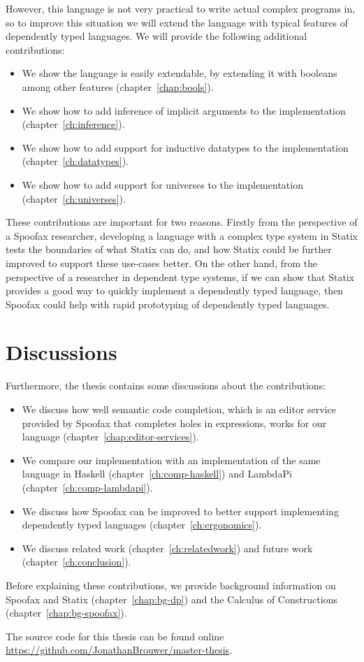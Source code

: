 However, this language is not very practical to write actual complex programs in, so to improve this situation we will extend the language with typical features of dependently typed languages. We will provide the following additional contributions:
\begin{itemize}
	\item We show the language is easily extendable, by extending it with booleans among other features (chapter~\ref{chap:bools}).
	\item We show how to add inference of implicit arguments to the implementation (chapter~\ref{ch:inference}).
	\item We show how to add support for inductive datatypes to the implementation (chapter~\ref{ch:datatypes}).
	\item We show how to add support for universes to the implementation (chapter~\ref{ch:universes}).
\end{itemize}

These contributions are important for two reasons. Firstly from the perspective of a Spoofax researcher, developing a language with a complex type system in Statix tests the boundaries of what Statix can do, and how Statix could be further improved to support these use-cases better. On the other hand, from the perspective of a researcher in dependent type systems, if we can show that Statix provides a good way to quickly implement a dependently typed language, then Spoofax could help with rapid prototyping of dependently typed languages.

\section*{Discussions}

Furthermore, the thesis contains some discussions about the contributions:
\begin{itemize}
	\item We discuss how well semantic code completion, which is an editor service provided by Spoofax that completes holes in expressions, works for our language (chapter~\ref{chap:editor-services}).
	\item We compare our implementation with an implementation of the same language in Haskell (chapter~\ref{ch:comp-haskell}) and LambdaPi (chapter~\ref{ch:comp-lambdapi}).
	\item We discuss how Spoofax can be improved to better support implementing dependently typed languages (chapter~\ref{ch:ergonomics}).
	\item We discuss related work (chapter~\ref{ch:relatedwork}) and future work (chapter~\ref{ch:conclusion}).
\end{itemize}

\noindent Before explaining these contributions, we provide background information on Spoofax and Statix (chapter~\ref{chap:bg-dp}) and the Calculus of Constructions (chapter~\ref{chap:bg-spoofax}).

The source code for this thesis can be found online \\ \url{https://github.com/JonathanBrouwer/master-thesis}.

